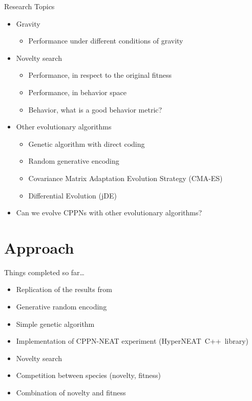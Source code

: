 \documentclass{beamer}
\begin{document}
\begin{frame}{Research Topics}
\begin{itemize}
\item Gravity
\begin{itemize}
\item Performance under different conditions of gravity
\end{itemize}
\item Novelty search
\begin{itemize}
\item Performance, in respect to the original fitness
\item Performance, in behavior space
\item Behavior, what is a good behavior metric?
\end{itemize}
\item Other evolutionary algorithms
\begin{itemize}
\item Genetic algorithm with direct coding
\item Random generative encoding
\item Covariance Matrix Adaptation Evolution Strategy (CMA-ES)
\item Differential Evolution (jDE)
\end{itemize}
\item Can we evolve CPPNs with other evolutionary algorithms?
\end{itemize}
\end{frame}





\section{Approach}

\begin{frame}{Things completed so far\ldots}
\begin{itemize}
\item Replication of the results from~\cite{cheney2013unshackling}
\item Generative random encoding
\item Simple genetic algorithm
\item Implementation of CPPN-NEAT experiment (HyperNEAT~C++~library)
\item Novelty search
\item Competition between species (novelty, fitness)
\item Combination of novelty and fitness
\end{itemize}
\end{frame}
\end{document}
